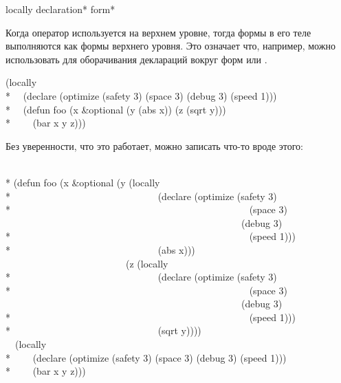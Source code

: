 \begin{defspec}
locally {declaration}* {form}*

Когда оператор  используется на верхнем уровне, тогда формы в его
теле выполняются как формы верхнего уровня. Это означает что, например,
 можно использовать для оборачивания деклараций вокруг форм
 или .
\begin{lisp}
(locally \\*
~~(declare (optimize (safety 3) (space 3) (debug 3) (speed 1))) \\*
~~(defun foo (x \&optional (y (abs x)) (z (sqrt y))) \\*
~~~~(bar x y z)))
\end{lisp}
Без уверенности, что это работает, можно записать что-то вроде этого:
\begin{lisp}
 \\*
(defun foo (x \&optional (y (locally \\*
~~~~~~~~~~~~~~~~~~~~~~~~~~~~~~(declare (optimize (safety 3) \\*
~~~~~~~~~~~~~~~~~~~~~~~~~~~~~~~~~~~~~~~~~~~~~~~~~(space 3) \\
~~~~~~~~~~~~~~~~~~~~~~~~~~~~~~~~~~~~~~~~~~~~~~~~~(debug 3) \\*
~~~~~~~~~~~~~~~~~~~~~~~~~~~~~~~~~~~~~~~~~~~~~~~~~(speed 1))) \\*
~~~~~~~~~~~~~~~~~~~~~~~~~~~~~~(abs x))) \\
~~~~~~~~~~~~~~~~~~~~~~~~~(z (locally \\*
~~~~~~~~~~~~~~~~~~~~~~~~~~~~~~(declare (optimize (safety 3) \\*
~~~~~~~~~~~~~~~~~~~~~~~~~~~~~~~~~~~~~~~~~~~~~~~~~(space 3) \\
~~~~~~~~~~~~~~~~~~~~~~~~~~~~~~~~~~~~~~~~~~~~~~~~~(debug 3) \\*
~~~~~~~~~~~~~~~~~~~~~~~~~~~~~~~~~~~~~~~~~~~~~~~~~(speed 1))) \\*
~~~~~~~~~~~~~~~~~~~~~~~~~~~~~~(sqrt y)))) \\
~~(locally \\*
~~~~(declare (optimize (safety 3) (space 3) (debug 3) (speed 1))) \\*
~~~~(bar x y z)))
\end{lisp}
\end{defspec}

